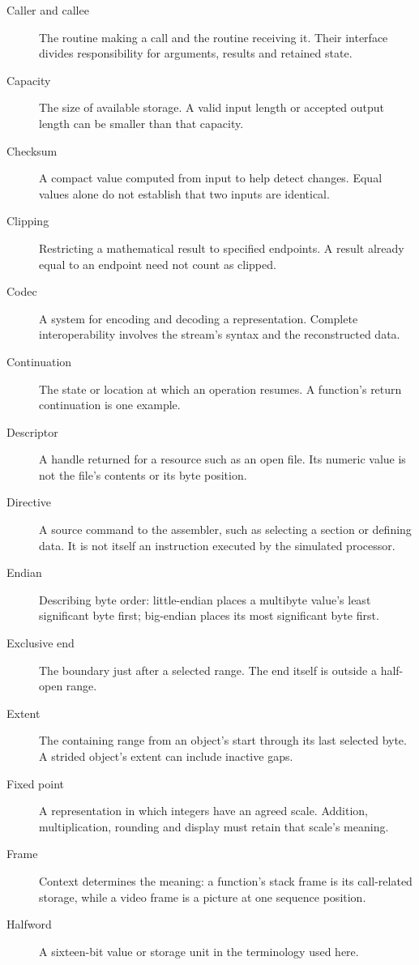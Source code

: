\begin{description}
  \item[Caller and callee] The routine making a call and the routine receiving it.
        Their interface divides responsibility for arguments, results and retained state.
  \item[Capacity] The size of available storage. A valid input length or accepted
        output length can be smaller than that capacity.
  \item[Checksum] A compact value computed from input to help detect changes. Equal values alone do not establish that two inputs are identical.
  \item[Clipping] Restricting a mathematical result to specified endpoints. A
        result already equal to an endpoint need not count as clipped.
  \item[Codec] A system for encoding and decoding a representation. Complete
        interoperability involves the stream's syntax and the reconstructed data.
  \item[Continuation] The state or location at which an operation resumes. A
        function's return continuation is one example.
  \item[Descriptor] A handle returned for a resource such as an open file. Its
        numeric value is not the file's contents or its byte position.
  \item[Directive] A source command to the assembler, such as selecting a section or defining data. It is not itself an instruction executed by the simulated processor.
  \item[Endian] Describing byte order: little-endian places a multibyte value's
        least significant byte first; big-endian places its most significant byte first.
  \item[Exclusive end] The boundary just after a selected range. The end itself is
        outside a half-open range.
  \item[Extent] The containing range from an object's start through its last
        selected byte. A strided object's extent can include inactive gaps.
  \item[Fixed point] A representation in which integers have an agreed scale.
        Addition, multiplication, rounding and display must retain that scale's meaning.
  \item[Frame] Context determines the meaning: a function's stack frame is its
        call-related storage, while a video frame is a picture at one sequence position.
  \item[Halfword] A sixteen-bit value or storage unit in the terminology used here.

\end{description}
